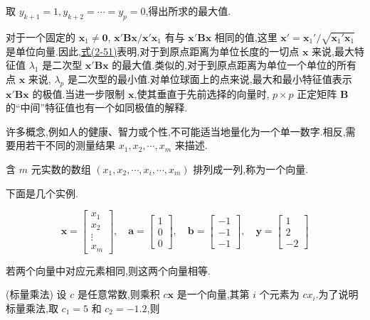 
取 $y_{k+1} = 1, y_{k+2} = \cdots = y_p = 0$,得出所求的最大值.

对于一个固定的 $\bm{x}_1 \neq \bm{0}$, $\bm{x}'\bm{B}\bm{x}/\bm{x}'\bm{x}_1$ 有与 $\bm{x}'\bm{B}\bm{x}$ 相同的值,这里 $\bm{x}' = \bm{x}_1'/\sqrt{\bm{x}_1'\bm{x}_1}$ 是单位向量.因此,\hyperref[eq:2-51]{式(2-51)}表明,对于到原点距离为单位长度的一切点 $\bm{x}$ 来说,最大特征值 $\lambda_1$ 是二次型 $\bm{x}'\bm{B}\bm{x}$ 的最大值.类似的,对于到原点距离为单位一个单位的所有点 $\bm{x}$ 来说, $\lambda_p$ 是二次型的最小值.对单位球面上的点来说,最大和最小特征值表示 $\bm{x}'\bm{B}\bm{x}$ 的极值.当进一步限制 $\bm{x}$,使其垂直于先前选择的向量时, $p \times p$ 正定矩阵 $\bm{B}$ 的“中间”特征值也有一个如同极值的解释.



许多概念,例如人的健康、智力或个性,不可能适当地量化为一个单一数字.相反,需要用若干不同的测量结果 $x_1, x_2, \cdots, x_m$ 来描述.

 含 $m$ 元实数的数组 $(x_1, x_2, \cdots, x_i, \cdots, x_m)$ 排列成一列,称为一个向量.

下面是几个实例.

\[
\bm{x} = \begin{bmatrix} x_1 \\ x_2 \\ \vdots \\ x_m \end{bmatrix}, \quad
\bm{a} = \begin{bmatrix} 1 \\ 0 \\ 0 \end{bmatrix}, \quad
\bm{b} = \begin{bmatrix} -1 \\ -1 \\ -1 \end{bmatrix}, \quad
\bm{y} = \begin{bmatrix} 1 \\ 2 \\ -2 \end{bmatrix}
\]

若两个向量中对应元素相同,则这两个向量相等.

 (标量乘法) 设 $c$ 是任意常数,则乘积 $c\bm{x}$ 是一个向量,其第 $i$ 个元素为 $cx_i$.为了说明标量乘法,取 $c_1 = 5$ 和 $c_2 = -1.2$,则

